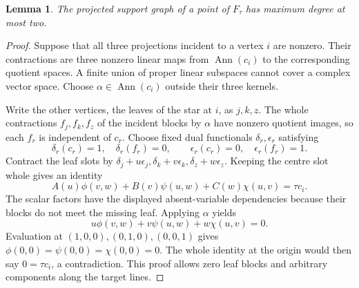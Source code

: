 \documentclass[11pt,letterpaper]{article}
\newcommand{\Ftau}{F_\tau}
\newtheorem{lemma}[theorem]{Lemma}
\theoremstyle{definition}
\begin{document}
\begin{lemma}\label{support:degree}
The projected support graph of a point of \(\Ftau\) has maximum degree at
most two.
\end{lemma}
\begin{proof}
Suppose that all three projections incident to a vertex \(i\) are nonzero.
Their contractions are three nonzero linear maps from
\(\operatorname{Ann}(c_i)\) to the corresponding quotient spaces. A finite
union of proper linear subspaces cannot cover a complex vector space.
Choose \(\alpha\in\operatorname{Ann}(c_i)\) outside their three kernels.

Write the other vertices, the leaves of the star at \(i\), as \(j,k,z\).
The whole contractions \(f_j,f_k,f_z\)
of the incident blocks by \(\alpha\) have nonzero quotient images, so each
\(f_r\) is independent of \(c_r\). Choose fixed dual functionals
\(\delta_r,\epsilon_r\) satisfying
\[
 \delta_r(c_r)=1,\quad \delta_r(f_r)=0,\qquad
 \epsilon_r(c_r)=0,\quad \epsilon_r(f_r)=1.
\]
Contract the leaf slots by
\(\delta_j+u\epsilon_j,\delta_k+v\epsilon_k,\delta_z+w\epsilon_z\).
Keeping the centre slot whole gives an identity
\[
 A(u)\phi(v,w)+B(v)\psi(u,w)+C(w)\chi(u,v)=\tau c_i.
\]
The scalar factors have the displayed absent-variable dependencies because
their blocks do not meet the missing leaf. Applying \(\alpha\) yields
\[
 u\phi(v,w)+v\psi(u,w)+w\chi(u,v)=0.
\]
Evaluation at \((1,0,0),(0,1,0),(0,0,1)\) gives
\(\phi(0,0)=\psi(0,0)=\chi(0,0)=0\). The whole identity at the origin would then say
\(0=\tau c_i\), a contradiction. This proof allows zero leaf blocks and
arbitrary components along the target lines.
\end{proof}
\end{document}
